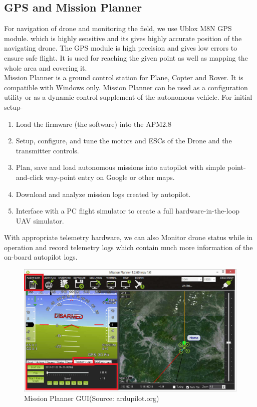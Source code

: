 \subsection{GPS and Mission Planner}
For navigation of drone and monitoring the field, we use Ublox M8N GPS module. which is highly sensitive and its gives highly accurate position of the navigating drone. The GPS module is high precision and gives low errors to ensure safe flight. It is used for reaching the given point as well as mapping the whole area and covering it.
\\
Mission Planner is a ground control station for Plane, Copter and Rover. It is compatible with Windows only. Mission Planner can be used as a configuration utility or as a dynamic control supplement of the autonomous vehicle. For initial setup-
\begin{enumerate}
    \item Load the firmware (the software) into the APM2.8
    \item Setup, configure, and tune the motors and ESCs of the Drone and the transmitter controls.
    \item Plan, save and load autonomous missions into autopilot with simple point-and-click way-point entry on Google or other maps.
    \item Download and analyze mission logs created by autopilot.
    \item Interface with a PC flight simulator to create a full hardware-in-the-loop UAV simulator.
\end{enumerate}

With appropriate telemetry hardware, we can also Monitor drone status while in operation and record telemetry logs which contain much more information of the on-board autopilot logs. 
\begin{figure}[H]
    \centering
    \includegraphics[width=\linewidth]{SummerInterReport/project/Images-Major/mp1.png}
    \caption{Mission Planner GUI(Source: ardupilot.org)}
    \label{fig:compEy}
\end{figure}

